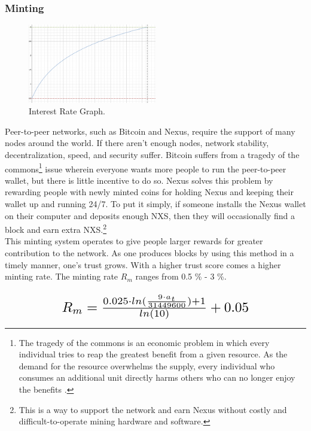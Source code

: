 \documentclass[11pt]{article}
\begin{document}
\subsubsection{Minting}

\begin{figure}\label{fig:interestrate} %
    \centering
    \includegraphics[width=0.50\textwidth]{interest.png}
    \caption{Interest Rate Graph.}
\end{figure}

Peer-to-peer networks, such as Bitcoin and Nexus, require the support of many nodes around the world.
If there aren't enough nodes, network stability, decentralization, speed, and security suffer.
Bitcoin suffers from a tragedy of the commons\footnote{The tragedy of the commons is an economic problem in which every individual tries to reap the greatest benefit from a given resource. As the demand for the resource overwhelms the supply, every individual who consumes an additional unit directly harms others who can no longer enjoy the benefits \cite{tragedycommons}.}
\noindent issue wherein everyone wants more people to run the peer-to-peer wallet, but there is little incentive to do so.
Nexus solves this problem by rewarding people with newly minted coins for holding Nexus and keeping their wallet up and running 24/7.
To put it simply, if someone installs the Nexus wallet on their computer and deposits enough NXS, then they will occasionally find a block and earn extra NXS.\footnote{This is a way to support the network and earn Nexus without costly and difficult-to-operate mining hardware and software.}\\

\noindent This minting system operates to give people larger rewards for greater contribution to the network. 
As one produces blocks by using this method in a timely manner, one's trust grows.
With a higher trust score comes a higher minting rate.
The minting rate $R_m$ ranges from 0.5 \% - 3 \%.

\paragraph{}
\begin{equation}
\resizebox{.65\hsize}{!}{$R_m = \frac{0.025 \cdot ln(\frac{9 \cdot a_{t}}{31449600}) + 1}{ln(10)} + 0.05$}
\end{equation}
\end{document}
